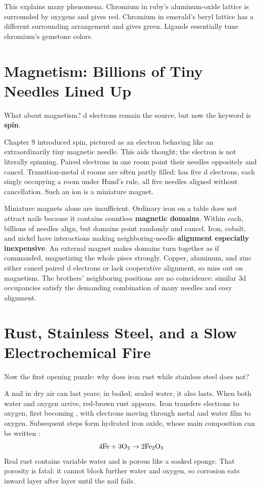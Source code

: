 This explains many phenomena. Chromium in ruby's aluminum-oxide lattice is surrounded by oxygens and gives red. Chromium in emerald's beryl lattice has a different surrounding arrangement and gives green. Ligands essentially tune chromium's gemstone colors.

\section{Magnetism: Billions of Tiny Needles Lined Up}

What about magnetism? d electrons remain the source, but now the keyword is \textbf{spin}.

Chapter 9 introduced spin, pictured as an electron behaving like an extraordinarily tiny magnetic needle. This aids thought; the electron is not literally spinning. Paired electrons in one room point their needles oppositely and cancel. Transition-metal d rooms are often partly filled:  has five d electrons, each singly occupying a room under Hund's rule, all five needles aligned without cancellation. Such an ion is a miniature magnet.

Miniature magnets alone are insufficient. Ordinary iron on a table does not attract nails because it contains countless \textbf{magnetic domains}. Within each, billions of needles align, but domains point randomly and cancel. Iron, cobalt, and nickel have interactions making neighboring-needle \textbf{alignment especially inexpensive}. An external magnet makes domains turn together as if commanded, magnetizing the whole piece strongly. Copper, aluminum, and zinc either cancel paired d electrons or lack cooperative alignment, so miss out on magnetism. The brothers' neighboring positions are no coincidence: similar 3d occupancies satisfy the demanding combination of many needles and easy alignment.

\section{Rust, Stainless Steel, and a Slow Electrochemical Fire}

Now the first opening puzzle: why does iron rust while stainless steel does not?

A nail in dry air can last years; in boiled, sealed water, it also lasts. When both water and oxygen arrive, red-brown rust appears. Iron transfers electrons to oxygen, first becoming , with electrons moving through metal and water film to oxygen. Subsequent steps form hydrated iron oxide, whose main composition can be written :
\[\mathrm{4Fe} + \mathrm{3O_2} \rightarrow \mathrm{2Fe_2O_3}\]
Real rust contains variable water and is porous like a soaked sponge. That porosity is fatal: it cannot block further water and oxygen, so corrosion eats inward layer after layer until the nail fails.

